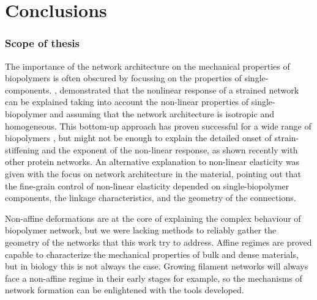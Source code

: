 
\chapter{Conclusions}
\label{Chapter-Conclusions}

\subsection{Scope of thesis}%
\label{sub:scope_of_thesis}

The importance of the network architecture on the mechanical properties of biopolymers is often obscured by focussing on the properties of single-components. \cite{storm_nonlinear_2005}, demonstrated that the nonlinear response of a strained network can be explained taking into account the non-linear properties of single-biopolymer and assuming that the network architecture is isotropic and homogeneous. This bottom-up approach has proven successful for a wide range of biopolymers \cite{carrillo_nonlinear_2013}, but might not be enough to explain the detailed onset of strain-stiffening and the exponent of the non-linear response, as shown recently with other protein networks\cite{licup_stress_2015}. An alternative explanation to non-linear elasticity was given with the focus on network architecture in the material\cite{onck_alternative_2005}, pointing out that the fine-grain control of non-linear elasticity depended on single-biopolymer components, the linkage characteristics, and the geometry of the connections.


Non-affine deformations are at the core of explaining the complex behaviour of biopolymer network, but we were lacking methods to reliably gather the geometry of the networks that this work try to address. Affine regimes are proved capable to characterize the mechanical properties of bulk and dense materials, but in biology this is not always the case. Growing filament networks will always face a non-affine regime in their early stages for example, so the mechanisms of network formation can be enlightened with the tools developed.

